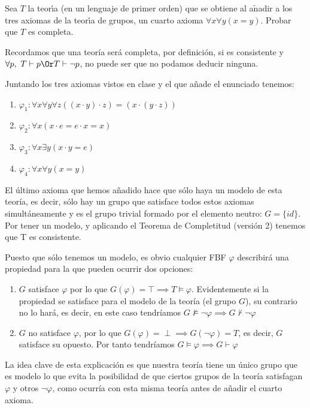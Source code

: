 \documentclass[nochap]{apuntes}
\begin{document}
\begin{problem} 
	Sea $T$ la teor\'{\i}a (en un lenguaje de primer orden) 
	que se obtiene al a$\operatorname{\tilde{n}}$adir a los tres axiomas de la teor\'{\i}a de  grupos,
	un cuarto axioma $\forall x\forall y (x = y)$. Probar que $T$ es completa.
	\solution
	
	
	Recordamos que una teoría será completa, por definición, si es consistente y $\forall p, \ T \vdash p \Or T\vdash \neg p$, no puede ser que no podamos deducir ninguna.
	
	Juntando los tres axiomas vistos en clase y el que añade el enunciado tenemos:
	\begin{enumerate}
		\item $\varphi_1: \forall x\forall y\forall z ((x\cdot y)\cdot z) = (x\cdot(y\cdot z))$
		\item $\varphi_2: \forall x(x\cdot e = e\cdot x = x)$
		\item $\varphi_3: \forall x\exists y (x\cdot y = e)$
		\item $\varphi_4: \forall x\forall y (x=y)$
	\end{enumerate}
	
	El último axioma que hemos añadido hace que sólo haya un modelo de esta teoría, es decir, sólo hay un grupo que satisface todos estos axiomas simultáneamente y es el grupo trivial formado por el elemento neutro: $G=\{id\}$. Por tener un modelo, y aplicando el Teorema de Completitud (versión 2) tenemos que T es consistente.
	
	Puesto que sólo tenemos un modelo, es obvio cualquier FBF $\varphi$ describirá una propiedad para la que pueden ocurrir dos opciones:
	\begin{enumerate}
		\item $G$ satisface $\varphi$ por lo que $G(\varphi)=\top \implies  T \vDash \varphi $. Evidentemente si la propiedad se satisface para el modelo de la teoría (el grupo $G$), su contrario no lo hará, es decir, en este caso tendríamos $G \nvDash \neg \varphi \implies G \nvdash \neg \varphi$
		
		
		\item $G$ no satisface $\varphi$, por lo que $G(\varphi) = \perp \implies G(\neg \varphi) = T$, es decir, $G$ satisface su opuesto. Por tanto tendríamos $G \vDash \varphi \implies G \vdash \varphi$
	\end{enumerate}
	
	La idea clave de esta explicación es que nuestra teoría tiene un único grupo que es modelo lo que evita la posibilidad de que ciertos grupos de la teoría satisfagan $\varphi$ y otros $\neg \varphi$, como ocurría con esta misma teoría antes de añadir el cuarto axioma.
	
	
\end{problem}
\end{document}
